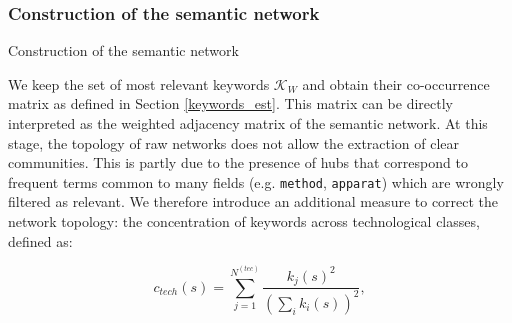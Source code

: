 \subsubsection*{Construction of the semantic network}{Construction of the semantic network}
\label{construction}

We keep the set of most relevant keywords $\mathcal{K}_W$ and obtain their co-occurrence matrix as defined in Section \ref{keywords_est}. This matrix can be directly interpreted as the weighted adjacency matrix of the semantic network. At this stage, the topology of raw networks does not allow the extraction of clear communities. This is partly due to the presence of hubs that correspond to frequent terms common to many fields (e.g. \texttt{method}, \texttt{apparat}) which are wrongly filtered as relevant. We therefore introduce an additional measure to correct the network topology: the concentration of keywords across technological classes, defined as: 

$$c_{tech}(s) = \displaystyle \sum_{j=1}^{N^{(tec)}} \frac{k_j(s)^2}{ \left(\sum_i k_i(s)\right)^2},$$  

